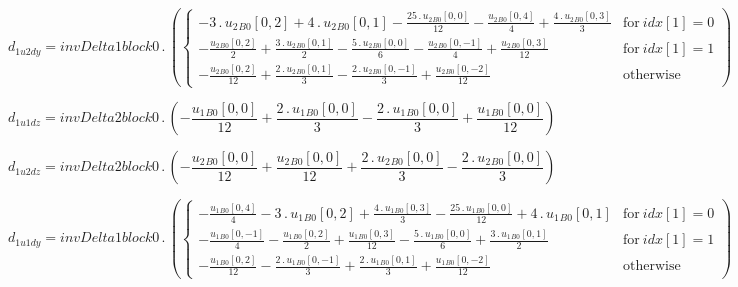 \documentclass{article}
\begin{document}
\begin{dmath}d_{1 u2 dy} = invDelta1block0 \,.\, \left(\begin{cases} - 3 \,.\, {u_{2}{_{B0}}}[{0,2}] + 4 \,.\, {u_{2}{_{B0}}}[{0,1}] - \frac{25 \,.\, {u_{2}{_{B0}}}[{0,0}]}{12} - \frac{{u_{2}{_{B0}}}[{0,4}]}{4} + \frac{4 \,.\, 
{u_{2}{_{B0}}}[{0,3}]}{3} & \text{for}\: {idx}[{1}] = 0 \\- \frac{{u_{2}{_{B0}}}[{0,2}]}{2} + \frac{3 \,.\, {u_{2}{_{B0}}}[{0,1}]}{2} - \frac{5 \,.\, {u_{2}{_{B0}}}[{0,0}]}{6} - \frac{{u_{2}{_{B0}}}[{0,-1}]}{4} + \frac{{u_{2}{_{B0}}}[{0,3}]}{12} & 
\text{for}\: {idx}[{1}] = 1 \\- \frac{{u_{2}{_{B0}}}[{0,2}]}{12} + \frac{2 \,.\, {u_{2}{_{B0}}}[{0,1}]}{3} - \frac{2 \,.\, {u_{2}{_{B0}}}[{0,-1}]}{3} + \frac{{u_{2}{_{B0}}}[{0,-2}]}{12} & \text{otherwise} \end{cases}\right)\end{dmath}

\begin{dmath}d_{1 u1 dz} = invDelta2block0 \,.\, \left(- \frac{{u_{1}{_{B0}}}[{0,0}]}{12} + \frac{2 \,.\, {u_{1}{_{B0}}}[{0,0}]}{3} - \frac{2 \,.\, {u_{1}{_{B0}}}[{0,0}]}{3} + \frac{{u_{1}{_{B0}}}[{0,0}]}{12}\right)\end{dmath}

\begin{dmath}d_{1 u2 dz} = invDelta2block0 \,.\, \left(- \frac{{u_{2}{_{B0}}}[{0,0}]}{12} + \frac{{u_{2}{_{B0}}}[{0,0}]}{12} + \frac{2 \,.\, {u_{2}{_{B0}}}[{0,0}]}{3} - \frac{2 \,.\, {u_{2}{_{B0}}}[{0,0}]}{3}\right)\end{dmath}

\begin{dmath}d_{1 u1 dy} = invDelta1block0 \,.\, \left(\begin{cases} - \frac{{u_{1}{_{B0}}}[{0,4}]}{4} - 3 \,.\, {u_{1}{_{B0}}}[{0,2}] + \frac{4 \,.\, {u_{1}{_{B0}}}[{0,3}]}{3} - \frac{25 \,.\, {u_{1}{_{B0}}}[{0,0}]}{12} + 4 \,.\, 
{u_{1}{_{B0}}}[{0,1}] & \text{for}\: {idx}[{1}] = 0 \\- \frac{{u_{1}{_{B0}}}[{0,-1}]}{4} - \frac{{u_{1}{_{B0}}}[{0,2}]}{2} + \frac{{u_{1}{_{B0}}}[{0,3}]}{12} - \frac{5 \,.\, {u_{1}{_{B0}}}[{0,0}]}{6} + \frac{3 \,.\, {u_{1}{_{B0}}}[{0,1}]}{2} & 
\text{for}\: {idx}[{1}] = 1 \\- \frac{{u_{1}{_{B0}}}[{0,2}]}{12} - \frac{2 \,.\, {u_{1}{_{B0}}}[{0,-1}]}{3} + \frac{2 \,.\, {u_{1}{_{B0}}}[{0,1}]}{3} + \frac{{u_{1}{_{B0}}}[{0,-2}]}{12} & \text{otherwise} \end{cases}\right)\end{dmath}
\end{document}
